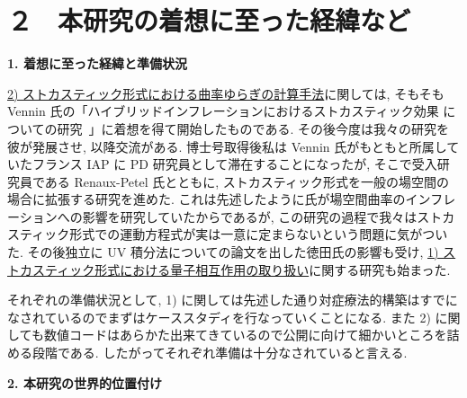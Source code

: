\documentclass[11pt,a4j,dvipdfmx]{jarticle} 					%
\newcommand{\研究課題名}{\mgfamily\sffamily ストカスティック形式で迫る重力と量子論}
\newcommand{\研究機関名}{\mgfamily\sffamily 名古屋大学}
\newcommand{\研究代表者氏名}{\mgfamily\sffamily 多田祐一郎}
\newcommand{\研究期間の最終元号年度}{34}  %
\begin{document}



\section{２　本研究の着想に至った経緯など}


\begin{mdframed}[roundcorner=0.5zw,
	innertopmargin=0.8zw,innerbottommargin=0.8zw,
	linecolor=black!50,linewidth=0.2zw,
	backgroundcolor=black!10]
	{\bfseries\gtfamily\sffamily\large 1. 着想に至った経緯と準備状況}
\end{mdframed}

\ul{2) ストカスティック形式における曲率ゆらぎの計算手法}に関しては, そもそも Vennin 氏の「ハイブリッドインフレーションにおけるストカスティック効果
についての研究~\cite{Martin:2011ib}」に着想を得て開始したものである. その後今度は我々の研究を彼が発展させ, 以降交流がある.
博士号取得後私は Vennin 氏がもともと所属していたフランス IAP に PD 研究員として滞在することになったが, 
そこで受入研究員である Renaux-Petel 氏とともに, ストカスティック形式を一般の場空間の場合に拡張する研究を進めた.
これは先述したように氏が場空間曲率のインフレーションへの影響を研究していたからであるが,
この研究の過程で我々はストカスティック形式での運動方程式が実は一意に定まらないという問題に気がついた.
その後独立に UV 積分法についての論文を出した徳田氏の影響も受け, \ul{1) ストカスティック形式における量子相互作用の取り扱い}に関する研究も始まった.

それぞれの準備状況として, 1) に関しては先述した通り対症療法的構築はすでになされているのでまずはケーススタディを行なっていくことになる.
また 2) に関しても数値コードはあらかた出来てきているので公開に向けて細かいところを詰める段階である. したがってそれぞれ準備は十分なされていると言える.

\begin{mdframed}[roundcorner=0.5zw,
	innertopmargin=0.8zw,innerbottommargin=0.8zw,
	linecolor=black!50,linewidth=0.2zw,
	backgroundcolor=black!10]
	{\bfseries\gtfamily\sffamily\large 2. 本研究の世界的位置付け}
\end{mdframed}
\end{document}
